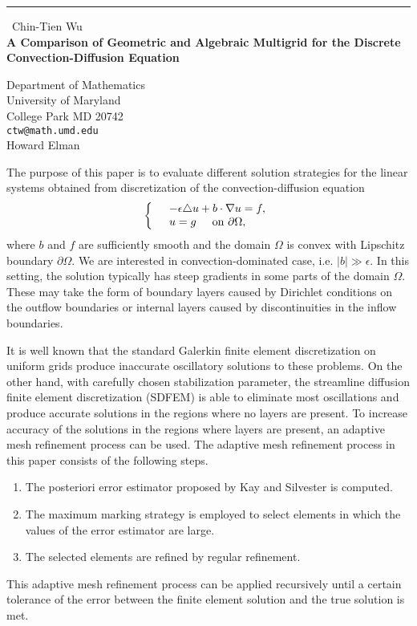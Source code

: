 \documentclass{report}
\begin{document}
\begin{center}
\rule{6in}{1pt} \
{\large Chin-Tien Wu \\
{\bf A Comparison of Geometric and Algebraic Multigrid for the Discrete Convection-Diffusion Equation}}

Department of Mathematics \\ University of Maryland \\ College Park MD 20742
\\
{\tt ctw@math.umd.edu}\\
Howard Elman\end{center}

The purpose of this paper is to evaluate
different solution strategies for the linear systems obtained from
discretization of the convection-diffusion equation \vspace{3mm}
\[
\left\{ \begin{array}{ll}
&-\epsilon \triangle u + b\cdot \nabla u = f,\\
&u=g \hspace{5mm} \mbox{on $\partial \Omega$},
\end{array} \right.\vspace{3mm}
\]
where $b$ and $f$ are sufficiently smooth and the
domain $\Omega$ is convex with Lipschitz boundary $\partial
\Omega$. We are interested in convection-dominated case, i.e. $|b| \gg
\epsilon$. In this setting, the solution typically has steep gradients in
some parts of the domain $\Omega$. These may take the form of boundary
layers caused by Dirichlet conditions on the outflow boundaries or
internal layers caused by discontinuities in the inflow boundaries.

It is well known that the standard Galerkin finite element
discretization on uniform grids produce inaccurate oscillatory
solutions to these problems. On the other hand, with carefully
chosen stabilization parameter, the streamline diffusion finite
element discretization (SDFEM) is able to eliminate most
oscillations and produce accurate solutions in the regions where
no layers are present. To increase accuracy of the solutions in
the regions where layers are present, an adaptive mesh refinement process
can be used. The adaptive mesh refinement process in this paper consists
of the following steps.\vspace{3mm}
\begin{enumerate}
\item The posteriori error estimator proposed by Kay and
Silvester is computed.
\item The maximum marking strategy is employed to select elements in
which the values of the error estimator are large.
\item The selected elements are refined by regular refinement.
\end{enumerate}
\vspace{3mm} This adaptive mesh refinement process can be applied
recursively until a certain tolerance of the error between the finite
element solution and the true solution is met.
\end{document}
